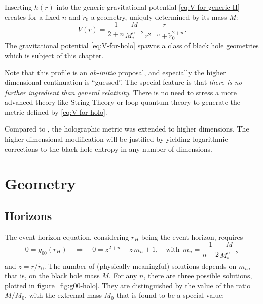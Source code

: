 \documentclass[12pt,a4paper]{report}
\numberwithin{equation}{chapter}
\begin{document}
Inserting $h(r)$ into the generic gravitational potential \eqref{eq:V-for-generic-H} creates for a fixed $n$ and $\tilde r_0$ a geometry, uniquly determined by its mass $M$:
\begin{equation}\label{eq:V-for-holo}
V(r) = \frac{1}{2+n} \frac{M}{M_*^{n+2}} \frac{r}{r^{2+n} + \tilde r_0^{2+n}}.
\end{equation}
The gravitational potential \eqref{eq:V-for-holo} spawns a class of black hole geometries which is subject of this chapter.

Note that this profile is an \emph{ab-initio} proposal, and especially the higher dimensional continuation is ``guessed''. The special feature is that \emph{there is no further ingredient than general relativity}. There is no need to stress a more advanced theory like String Theory or loop quantum theory to generate the metric defined by \eqref{eq:V-for-holo}.

Compared to \cite{NS2013}, the holographic metric was extended to higher dimensions. The higher dimensional modification will be justified by yielding logarithmic corrections to the black hole entropy in any number of dimensions.

\section{Geometry}\label{sec:geometry-holo}
\subsection{Horizons}
The event horizon equation, considering $r_H$ being the event horizon, requires
\begin{equation}
0 = g_{00}(r_H)
\quad\Rightarrow\quad
0
= z^{2+n} - z\, m_n + 1,
\quad\text{with}~~ m_n = \frac 1{n+2} \frac M{M_*^{n+2}}
\end{equation}
and $z=r/\tilde r_0$. The number of (physically meaningful) solutions depends on $m_n$, that is, on the black hole mass $M$. For any $n$, there are three possible solutions, plotted in figure~\ref{fig:g00-holo}. They are distinguished by the value of the ratio $M/M_0$, with the extremal mass $M_0$ that is found to be a special value:
\end{document}
